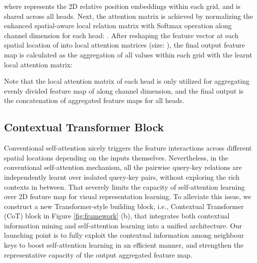 \documentclass[10pt,twocolumn,letterpaper]{article}
\begin{document}
where  represents the 2D relative position embeddings within each  grid, and is shared across all  heads.
Next, the attention matrix  is achieved by normalizing the enhanced spatial-aware local relation matrix  with Softmax operation along channel dimension for each head: . After reshaping the feature vector at each spatial location of  into  local attention matrices (size: ), the final output feature map is calculated as the aggregation of all values within each  grid with the learnt local attention matrix:

Note that the local attention matrix of each head is only utilized for aggregating evenly divided feature map of  along channel dimension, and the final output  is the concatenation of aggregated feature maps for all heads.

\subsection{Contextual Transformer Block}

Conventional self-attention nicely triggers the feature interactions across different spatial locations depending on the inputs themselves. Nevertheless, in the conventional self-attention mechanism, all the pairwise query-key relations are independently learnt over isolated query-key pairs, without exploring the rich contexts in between. That severely limits the capacity of self-attention learning over 2D feature map for visual representation learning.
To alleviate this issue, we construct a new Transformer-style building block, i.e., Contextual Transformer (CoT) block in Figure \ref{fig:framework} (b), that integrates both contextual information mining and self-attention learning into a unified architecture. Our launching point is to fully exploit the contextual information among neighbour keys to boost self-attention learning in an efficient manner, and strengthen the representative capacity of the output aggregated feature map.
\end{document}
